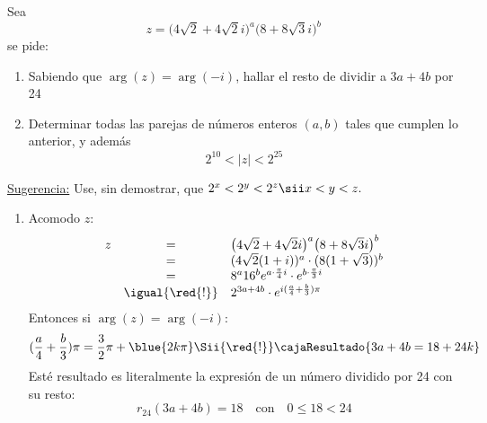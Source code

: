 \begin{enunciado}{\ejExtra}
  Sea
  $$
    z = \big(4\sqrt{2} + 4\sqrt{2}i\big)^a \big(8+8\sqrt{3}i\big)^b
  $$
  se pide:
  \begin{enumerate}[label=\alph*)]
    \item Sabiendo que $\arg(z) = \arg(-i)$, hallar el resto de dividir a $3a + 4b$ por 24
    \item Determinar todas las parejas de números enteros $(a,b)$ tales que cumplen lo anterior, y además
          $$
            2^{10} < |z| < 2 ^{25}
          $$
  \end{enumerate}
  \underline{Sugerencia:} Use, sin demostrar, que $2^x < 2^y < 2^z \sii x < y < z.$
\end{enunciado}

\begin{enumerate}[label=\alph*)]
  \item
        Acomodo $z$:
        $$
          \begin{array}{rcl}
            z & =               & \big(4\sqrt{2} + 4\sqrt{2}i\big)^a \big(8+8\sqrt{3}i\big)^b             \\
              & =               & (4\sqrt{2} ( 1 + i ))^a \cdot (8(1 + \sqrt{3}))^b                       \\
              & =               & 8^a 16^b  e^{a \cdot \frac{\pi}{4} i} \cdot e^{b \cdot \frac{\pi}{3} i} \\
              & \igual{\red{!}} & 2^{3a + 4b} \cdot e^{i (\frac{a}{4}  +  \frac{b}{3} ) \pi}
          \end{array}
        $$
        Entonces si $\arg(z) = \arg(-i)$:
        $$
          (\frac{a}{4}  +  \frac{b}{3} ) \pi = \frac{3}{2} \pi + \blue{2k\pi}
          \Sii{\red{!}}
          \cajaResultado{3a  +  4b = 18 + 24k}
        $$
        Esté resultado es literalmente la expresión de un número dividido por 24 con su resto:
        $$
          r_{24}(3a+4b) = 18 \quad \text{con} \quad 0\leq 18 < 24
        $$


\end{enumerate}
